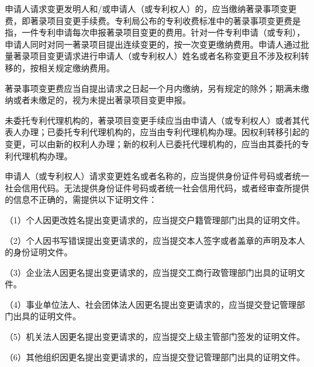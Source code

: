 申请人请求变更发明人和/或申请人（或专利权人）的，应当缴纳著录事项变更费，即著录项目变更手续费。专利局公布的专利收费标准中的著录事项变更费是指，一件专利申请每次申报著录项目变更的费用。针对一件专利申请（或专利），申请人同时对同一著录项目提出连续变更的，按一次变更缴纳费用。申请人通过批量著录项目变更请求进行申请人（或专利权人）姓名或者名称变更且不涉及权利转移的，按相关规定缴纳费用。

著录事项变更费应当自提出请求之日起一个月内缴纳，另有规定的除外；期满未缴纳或者未缴足的，视为未提出著录项目变更申报。

未委托专利代理机构的，著录项目变更手续应当由申请人（或专利权人）或者其代表人办理；已委托专利代理机构的，应当由专利代理机构办理。因权利转移引起的变更，可以由新的权利人办理；新的权利人已委托代理机构的，应当由其委托的专利代理机构办理。

申请人（或专利权人）请求变更姓名或者名称的，应当提供身份证件号码或者统一社会信用代码。无法提供身份证件号码或者统一社会信用代码，或者经审查所提供的信息不正确的，需提供以下证明文件：

{\setlength{\parindent}{17.1bp}（1）个人因更改姓名提出变更请求的，应当提交户籍管理部门出具的证明文件。\par}

{\setlength{\parindent}{17.1bp}（2）个人因书写错误提出变更请求的，应当提交本人签字或者盖章的声明及本人的身份证明文件。\par}

{\setlength{\parindent}{17.1bp}（3）企业法人因更名提出变更请求的，应当提交工商行政管理部门出具的证明文件。\par}

{\setlength{\parindent}{17.1bp}（4）事业单位法人、社会团体法人因更名提出变更请求的，应当提交登记管理部门出具的证明文件。\par}

{\setlength{\parindent}{17.1bp}（5）机关法人因更名提出变更请求的，应当提交上级主管部门签发的证明文件。\par}

{\setlength{\parindent}{17.1bp}（6）其他组织因更名提出变更请求的，应当提交登记管理部门出具的证明文件。\par}

